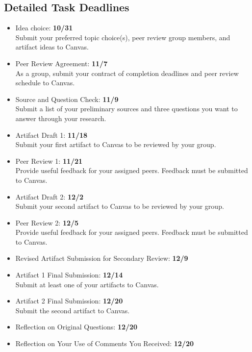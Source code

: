 \documentclass[12pt]{article}
\begin{document}
	\subsection*{Detailed Task Deadlines}
	\begin{itemize}
		\item Idea choice: \textbf{10/31} \\
		Submit your preferred topic choice(s), peer review group members, and artifact ideas to Canvas.
		\item Peer Review Agreement: \textbf{11/7}\\
		As a group, submit your contract of completion deadlines and peer review schedule to Canvas.
		\item Source and Question Check: \textbf{11/9} \\
		Submit a list of your preliminary sources and three questions you want to answer through your research.
		\item Artifact Draft 1: \textbf{11/18}\\
		Submit your first artifact to Canvas to be reviewed by your group.
		\item Peer Review 1: \textbf{11/21}\\
		Provide useful feedback for your assigned peers. Feedback must be submitted to Canvas.
		\item Artifact Draft 2: \textbf{12/2}\\
		Submit your second artifact to Canvas to be reviewed by your group.
		\item Peer Review 2: \textbf{12/5}\\
		Provide useful feedback for your assigned peers. Feedback must be submitted to Canvas.
		\item Revised Artifact Submission for Secondary Review: \textbf{12/9}
		\item Artifact 1 Final Submission: \textbf{12/14}\\
		Submit at least one of your artifacts to Canvas.
		\item Artifact 2 Final Submission: \textbf{12/20}\\	
		Submit the second artifact to Canvas.
		\item Reflection on Original Questions: \textbf{12/20}
		\item Reflection on Your Use of Comments You Received: \textbf{12/20}
	\end{itemize}
\end{document}
